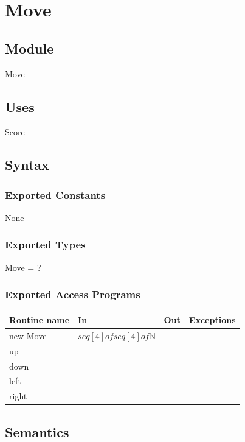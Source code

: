 \documentclass[12pt]{article}
\begin{document}
\newpage

\section* {Move}

\subsection*{Module}

Move

\subsection* {Uses}

Score

\subsection* {Syntax}

\subsubsection* {Exported Constants}

None

\subsubsection* {Exported Types}

Move = ?

\subsubsection* {Exported Access Programs}

\begin{tabular}{| l | l | l | p{5cm} |}
  \hline
  \textbf{Routine name} & \textbf{In} & \textbf{Out} & \textbf{Exceptions}\\
  \hline
  new Move & $seq[4] of seq[4] of \mathbb{N}$ & & \\
  \hline
  up & & & \\
  \hline
  down & & & \\
  \hline
  left & & & \\
  \hline
  right & & & \\
  \hline
  
\end{tabular}

\subsection* {Semantics}
\end{document}
